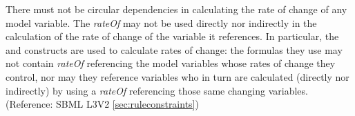 There must not be circular dependencies in calculating the rate of change of any model variable.  The \emph{rateOf}  may not be used directly nor indirectly in the calculation of the rate of change of the variable it references.  In particular, the \RateRule and \KineticLaw constructs are used to calculate rates of change: the formulas they use may not contain \emph{rateOf}  referencing the model variables whose rates of change they control, nor may they reference variables who in turn are calculated (directly nor indirectly) by using a \emph{rateOf}  referencing those same changing variables. (Reference: SBML L3V2 \ref{sec:ruleconstraints})
